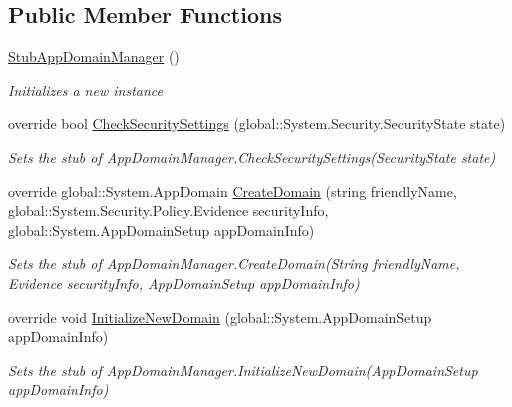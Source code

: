 \subsection*{Public Member Functions}
\begin{DoxyCompactItemize}
\item 
\hyperlink{class_system_1_1_fakes_1_1_stub_app_domain_manager_a9c42350b80b07cd867268c8cd32d61e0}{Stub\-App\-Domain\-Manager} ()
\begin{DoxyCompactList}\small\item\em Initializes a new instance\end{DoxyCompactList}\item 
override bool \hyperlink{class_system_1_1_fakes_1_1_stub_app_domain_manager_a221128b94b3142fcb313f2f334880348}{Check\-Security\-Settings} (global\-::\-System.\-Security.\-Security\-State state)
\begin{DoxyCompactList}\small\item\em Sets the stub of App\-Domain\-Manager.\-Check\-Security\-Settings(\-Security\-State state)\end{DoxyCompactList}\item 
override global\-::\-System.\-App\-Domain \hyperlink{class_system_1_1_fakes_1_1_stub_app_domain_manager_a0ca585a83de150433752154583b4311c}{Create\-Domain} (string friendly\-Name, global\-::\-System.\-Security.\-Policy.\-Evidence security\-Info, global\-::\-System.\-App\-Domain\-Setup app\-Domain\-Info)
\begin{DoxyCompactList}\small\item\em Sets the stub of App\-Domain\-Manager.\-Create\-Domain(\-String friendly\-Name, Evidence security\-Info, App\-Domain\-Setup app\-Domain\-Info)\end{DoxyCompactList}\item 
override void \hyperlink{class_system_1_1_fakes_1_1_stub_app_domain_manager_ac5c3456de96d991ebf9cbb27e31bc49e}{Initialize\-New\-Domain} (global\-::\-System.\-App\-Domain\-Setup app\-Domain\-Info)
\begin{DoxyCompactList}\small\item\em Sets the stub of App\-Domain\-Manager.\-Initialize\-New\-Domain(\-App\-Domain\-Setup app\-Domain\-Info)\end{DoxyCompactList}\end{DoxyCompactItemize}
